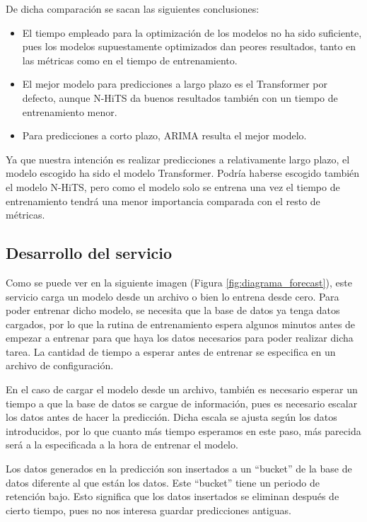 De dicha comparación se sacan las siguientes conclusiones:
\begin{itemize}
    \item El tiempo empleado para la optimización de los modelos no ha sido suficiente, pues los modelos
        supuestamente optimizados dan peores resultados, tanto en las métricas como en el tiempo de entrenamiento.
    \item El mejor modelo para predicciones a largo plazo es el Transformer por defecto, aunque N-HiTS da buenos
        resultados también con un tiempo de entrenamiento menor.
    \item Para predicciones a corto plazo, ARIMA resulta el mejor modelo.
\end{itemize}

Ya que nuestra intención es realizar predicciones a relativamente largo plazo, el modelo escogido ha sido el modelo 
Transformer. Podría haberse escogido también el modelo N-HiTS, pero como el modelo solo se entrena una vez el tiempo 
de entrenamiento tendrá una menor importancia comparada con el resto de métricas.

\subsection{Desarrollo del servicio}

Como se puede ver en la siguiente imagen (Figura \ref{fig:diagrama_forecast}), este servicio carga un modelo desde 
un archivo o bien lo entrena desde cero. Para poder entrenar dicho modelo, se necesita que la base de datos ya tenga 
datos cargados, por lo que la rutina de entrenamiento espera algunos minutos antes de empezar a entrenar para que 
haya los datos necesarios para poder realizar dicha tarea. La cantidad de tiempo a esperar antes de entrenar se especifica 
en un archivo de configuración.

En el caso de cargar el modelo desde un archivo, también es necesario esperar un tiempo a que la base de datos se cargue 
de información, pues es necesario escalar los datos antes de hacer la predicción. Dicha escala se ajusta según los datos 
introducidos, por lo que cuanto más tiempo esperamos en este paso, más parecida será a la especificada a la hora
de entrenar el modelo.

Los datos generados en la predicción son insertados a un ``bucket'' de la base de datos diferente al que están los datos.
Este ``bucket'' tiene un periodo de retención bajo. Esto significa que los datos insertados se eliminan después 
de cierto tiempo, pues no nos interesa guardar predicciones antiguas.

